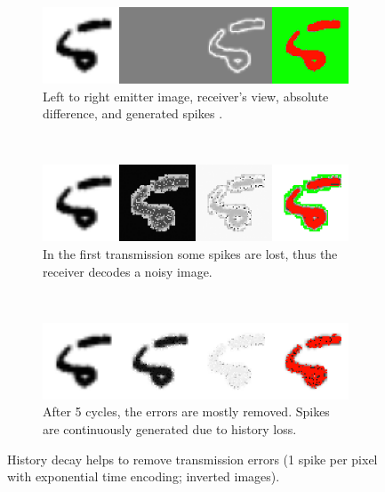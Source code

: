 \documentclass[twocolumn]{article}
\begin{document}
\begin{figure}[htb]
  \captionsetup[subfigure]{justification=centering}
  \centering
  \begin{subfigure}[b]{0.35\textwidth}
    \includegraphics[width=\textwidth]{update_weight_0_95_error_20_img_10_bits_1_cycle_0}
    \caption{Left to right emitter image, receiver's view, absolute difference, and generated spikes .}
    \label{fig:hist_decay_pre}
  \end{subfigure}\\
  \begin{subfigure}[b]{0.35\textwidth}
    \includegraphics[width=\textwidth]{update_weight_0_95_error_20_img_10_bits_1_cycle_1}
    \caption{In the first transmission some spikes are lost, thus the receiver decodes a noisy image.}
    \label{fig:hist_decay_first}
  \end{subfigure}\\
  \begin{subfigure}[b]{0.35\textwidth}
    \includegraphics[width=\textwidth]{update_weight_0_95_error_20_img_10_bits_1_cycle_5}
    \caption{After 5 cycles, the errors are mostly removed. Spikes are continuously generated due to history loss.}
    \label{fig:hist_decay_fifth}
  \end{subfigure}%
  
  
  \caption{History decay helps to remove transmission errors (1 spike per pixel with exponential time encoding; inverted images).}
  \label{fig:history_decay}
\end{figure}
\end{document}
